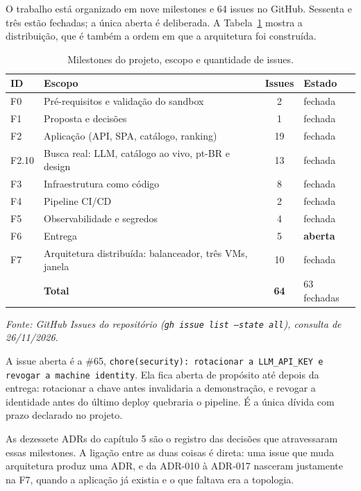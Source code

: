 \documentclass[11pt,a4paper]{article}
\begin{document}
O trabalho está organizado em nove milestones e 64 issues no GitHub. Sessenta e três estão fechadas;
a única aberta é deliberada. A Tabela~\ref{tab:ms} mostra a distribuição, que é também a ordem em que
a arquitetura foi construída.

\begin{table}[tb]
\caption{Milestones do projeto, escopo e quantidade de issues.}
\label{tab:ms}
\centering\small
\begin{tabularx}{\textwidth}{p{1.2cm}Xcp{2.4cm}}
\toprule
\textbf{ID} & \textbf{Escopo} & \textbf{Issues} & \textbf{Estado} \\
\midrule
F0 & Pré-requisitos e validação do sandbox & 2 & fechada \\
F1 & Proposta e decisões & 1 & fechada \\
F2 & Aplicação (API, SPA, catálogo, ranking) & 19 & fechada \\
F2.10 & Busca real: LLM, catálogo ao vivo, pt-BR e design & 13 & fechada \\
F3 & Infraestrutura como código & 8 & fechada \\
F4 & Pipeline CI/CD & 2 & fechada \\
F5 & Observabilidade e segredos & 4 & fechada \\
F6 & Entrega & 5 & \textbf{aberta} \\
F7 & Arquitetura distribuída: balanceador, três VMs, janela & 10 & fechada \\
\midrule
 & \textbf{Total} & \textbf{64} & 63 fechadas \\
\bottomrule
\end{tabularx}
{\small\itshape Fonte: GitHub Issues do repositório (\texttt{gh issue list --state all}),
consulta de 26/11/2026.}
\end{table}

A issue aberta é a \#65, \texttt{chore(security): rotacionar a LLM\_\allowbreak{}API\_\allowbreak{}KEY e revogar a machine
identity}. Ela fica aberta de propósito até depois da entrega: rotacionar a chave antes invalidaria a
demonstração, e revogar a identidade antes do último deploy quebraria o pipeline. É a única dívida
com prazo declarado no projeto.

As dezessete ADRs do capítulo 5 são o registro das decisões que atravessaram essas milestones. A
ligação entre as duas coisas é direta: uma issue que muda arquitetura produz uma ADR, e da ADR-010
à ADR-017 nasceram justamente na F7, quando a aplicação já existia e o que faltava era a topologia.
\end{document}
